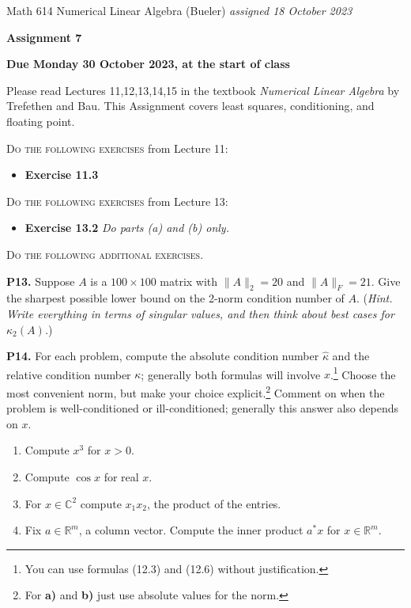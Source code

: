 \documentclass[12pt]{amsart}
\newcommand{\CC}{\mathbb{C}}
\newcommand{\RR}{\mathbb{R}}
\newcommand{\prob}[1]{\bigskip\noindent\textbf{#1.}\quad }
\begin{document}
\scriptsize \noindent Math 614 Numerical Linear Algebra (Bueler) \hfill \emph{assigned 18 October 2023}
\normalsize\medskip

\Large\centerline{\textbf{Assignment 7}}
\large
\medskip

\centerline{\textbf{Due Monday 30 October 2023, at the start of class}}
\medskip
\normalsize

\thispagestyle{empty}

\bigskip
\noindent Please read Lectures 11,12,13,14,15 in the textbook \emph{Numerical Linear Algebra} by Trefethen and Bau.  This Assignment covers least squares, conditioning, and floating point.

\bigskip
\noindent \textsc{Do the following exercises} from Lecture 11:

\begin{itemize}
\item \textbf{Exercise 11.3}
\end{itemize}

\bigskip
\noindent \textsc{Do the following exercises} from Lecture 13:

\begin{itemize}
\item \textbf{Exercise 13.2} \quad \emph{Do parts \emph{(a)} and \emph{(b)} only.}
\end{itemize}


\bigskip
\noindent \textsc{Do the following additional exercises.}

\medskip

\prob{P13}  Suppose $A$ is a $100\times 100$ matrix with $\|A\|_2=20$ and $\|A\|_F=21$.  Give the sharpest possible lower bound on the 2-norm condition number of $A$.  (\emph{Hint.  Write everything in terms of singular values, and then think about best cases for $\kappa_2(A)$.})


\prob{P14}  For each problem, compute the absolute condition number $\hat\kappa$ and the relative condition number $\kappa$; generally both formulas will involve $x$.\footnote{You can use formulas (12.3) and (12.6) without justification.}  Choose the most convenient norm, but make your choice explicit.\footnote{For \textbf{a)} and \textbf{b)} just use absolute values for the norm.}  Comment on when the problem is well-conditioned or ill-conditioned; generally this answer also depends on $x$.
\renewcommand{\labelenumi}{\textbf{\alph{enumi})}}
\begin{enumerate}
\item Compute $x^3$ for $x>0$.
\item Compute $\cos x$ for real $x$.
\item For $x\in\CC^2$ compute $x_1x_2$, the product of the entries.
\item Fix $a\in\RR^m$, a column vector.  Compute the inner product $a^*x$ for $x\in \RR^m$.
\end{enumerate}
\end{document}
